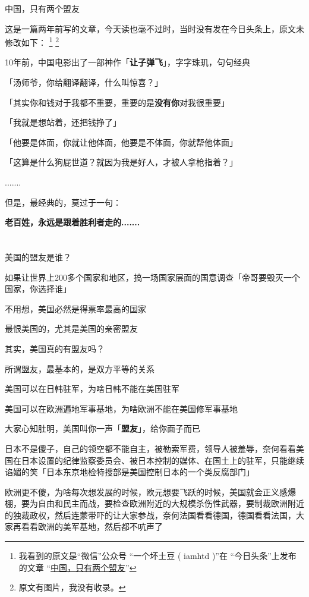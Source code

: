 \documentclass[UTF8, 11pt, oneside]{ctexart}
\newcommand{\zd}[1]{\textbf{\textcolor[RGB]{123,12,0}{#1}}} %
\begin{document}
\begin{center}
    \LARGE{中国，只有两个盟友}
\end{center}

这是一篇两年前写的文章，今天读也毫不过时，当时没有发在今日头条上，原文未修改如下：
\footnote{
    我看到的原文是“微信”公众号 “一个坏土豆 ( iamhtd )”在 “今日头条”上发布的文章
    “\href{https://www.toutiao.com/i7072688443138015744}{中国，只有两个盟友}” }
\footnote{原文有图片，我没有收录。}

10年前，中国电影出了一部神作「\zd{让子弹飞}」，字字珠玑，句句经典

「汤师爷，你给翻译翻译，什么叫惊喜？」

「其实你和钱对于我都不重要，重要的是\zd{没有你}对我很重要」

「我就是想站着，还把钱挣了」

「他要是体面，你就让他体面，他要是不体面，你就帮他体面」

「这算是什么狗屁世道？就因为我是好人，才被人拿枪指着？」

.......

但是，最经典的，莫过于一句：

\zd{老百姓，永远是跟着胜利者走的.......}

\section{}

美国的盟友是谁？

如果让世界上200多个国家和地区，搞一场国家层面的国意调查「帝哥要毁灭一个国家，你选择谁」

不用想，美国必然是得票率最高的国家

最恨美国的，尤其是美国的亲密盟友

其实，美国真的有盟友吗？

所谓盟友，最基本的，是双方平等的关系

美国可以在日韩驻军，为啥日韩不能在美国驻军

美国可以在欧洲遍地军事基地，为啥欧洲不能在美国修军事基地

大家心知肚明，美国叫你一声「\zd{盟友}」，给你面子而已

日本不是傻子，自己的领空都不能自主，被勒索军费，领导人被羞辱，奈何看看美国在日本设置的纪律监察委员会、被日本控制的媒体、在国土上的驻军，只能继续谄媚的笑「日本东京地检特搜部是美国控制日本的一个类反腐部门」

欧洲更不傻，为啥每次想发展的时候，欧元想要飞跃的时候，美国就会正义感爆棚，要为自由和民主而战，要检查欧洲附近的大规模杀伤性武器，要制裁欧洲附近的独裁政权，然后连蒙带吓的让大家参战，奈何法国看看德国，德国看看法国，大家再看看欧洲的美军基地，然后都不吭声了
\end{document}
